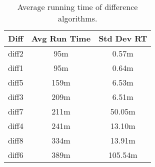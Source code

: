 \begin{table}[tbph]
\begin{center}
\begin{tabular}{|c||c|c|}
\hline
Diff & Avg Run Time & Std Dev RT  \\
\hline
\hline
diff2 & 95m & 0.57m \\
diff1 & 95m & 0.64m \\
diff5 & 159m & 6.53m \\
diff3 & 209m & 6.51m \\
diff7 & 211m & 50.05m \\
diff4 & 241m & 13.10m \\
diff8 & 334m & 13.91m \\
diff6 & 389m & 105.54m \\
\hline
\end{tabular}
\end{center}
\caption[Average running time of difference algorithms]
  {Average running time of difference algorithms.}
\label{tab:difftiming}
\end{table}
